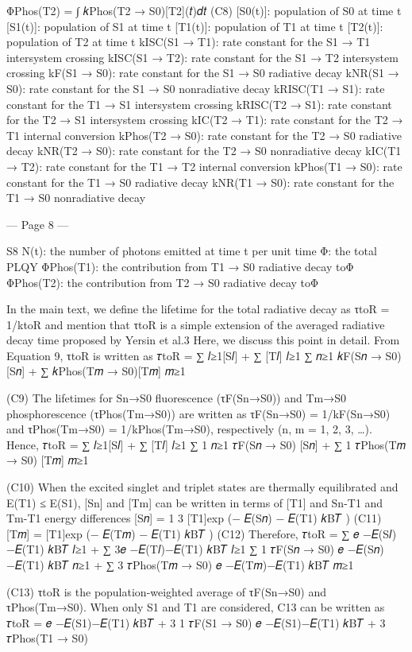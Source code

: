 ΦPhos(T2) = ∫ 𝑘Phos(T2 → S0)[T2](𝑡)𝑑𝑡 
(C8) 
[S0(t)]: population of S0 at time t 
[S1(t)]: population of S1 at time t 
[T1(t)]: population of T1 at time t 
[T2(t)]: population of T2 at time t 
kISC(S1 → T1): rate constant for the S1 → T1 intersystem crossing 
kISC(S1 → T2): rate constant for the S1 → T2 intersystem crossing 
kF(S1 → S0): rate constant for the S1 → S0 radiative decay 
kNR(S1 → S0): rate constant for the S1 → S0 nonradiative decay 
kRISC(T1 → S1): rate constant for the T1 → S1 intersystem crossing 
kRISC(T2 → S1): rate constant for the T2 → S1 intersystem crossing 
kIC(T2 → T1): rate constant for the T2 → T1 internal conversion 
kPhos(T2 → S0): rate constant for the T2 → S0 radiative decay 
kNR(T2 → S0): rate constant for the T2 → S0 nonradiative decay 
kIC(T1 → T2): rate constant for the T1 → T2 internal conversion 
kPhos(T1 → S0): rate constant for the T1 → S0 radiative decay 
kNR(T1 → S0): rate constant for the T1 → S0 nonradiative decay 


--- Page 8 ---
 
S8 
N(t): the number of photons emitted at time t per unit time 
Φ: the total PLQY 
ΦPhos(T1): the contribution from T1 → S0 radiative decay toΦ 
ΦPhos(T2): the contribution from T2 → S0 radiative decay toΦ 
 
In the main text, we define the lifetime for the total radiative decay as τtoR = 1/ktoR and 
mention that τtoR is a simple extension of the averaged radiative decay time proposed by 
Yersin et al.3 Here, we discuss this point in detail. From Equation 9, τtoR is written as 
𝜏toR =
∑
𝑙≥1[S𝑙]
+ ∑
[T𝑙]
𝑙≥1
∑
𝑛≥1 𝑘F(S𝑛 → S0)[S𝑛]
+ ∑
𝑘Phos(T𝑚 → S0)[T𝑚]
𝑚≥1
 
(C9) 
The lifetimes for Sn→S0 fluorescence (τF(Sn→S0)) and Tm→S0 phosphorescence 
(τPhos(Tm→S0)) are written as τF(Sn→S0) = 1/kF(Sn→S0) and τPhos(Tm→S0) = 1/kPhos(Tm→S0), 
respectively (n, m = 1, 2, 3, …). Hence,  
𝜏toR =
∑
𝑙≥1[S𝑙]
+ ∑
[T𝑙]
𝑙≥1
∑
1
𝑛≥1 𝜏F(S𝑛 → S0) [S𝑛]
+ ∑
1
𝜏Phos(T𝑚 → S0) [T𝑚]
𝑚≥1
 
(C10) 
When the excited singlet and triplet states are thermally equilibrated and E(T1) ≤ E(S1), [Sn] 
and [Tm] can be written in terms of [T1] and Sn-T1 and Tm-T1 energy differences 
[S𝑛] = 1
3 [T1]exp (− 𝐸(S𝑛) − 𝐸(T1)
𝑘B𝑇
) 
(C11) 
[T𝑚] = [T1]exp (− 𝐸(T𝑚) − 𝐸(T1)
𝑘B𝑇
) 
(C12) 
Therefore, 
𝜏toR =
∑
𝑒
−𝐸(S𝑙)−𝐸(T1)
𝑘B𝑇
𝑙≥1
+ ∑
3𝑒
−𝐸(T𝑙)−𝐸(T1)
𝑘B𝑇
𝑙≥1
∑
1
𝜏F(S𝑛 → S0) 𝑒
−𝐸(S𝑛)−𝐸(T1)
𝑘B𝑇
𝑛≥1
+ ∑
3
𝜏Phos(T𝑚 → S0) 𝑒
−𝐸(T𝑚)−𝐸(T1)
𝑘B𝑇
𝑚≥1
 
(C13) 
τtoR is the population-weighted average of τF(Sn→S0) and τPhos(Tm→S0). When only S1 and T1 
are considered, C13 can be written as 
𝜏toR =
𝑒
−𝐸(S1)−𝐸(T1)
𝑘B𝑇
+ 3
1
𝜏F(S1 → S0) 𝑒
−𝐸(S1)−𝐸(T1)
𝑘B𝑇
+
3
𝜏Phos(T1 → S0)
 
